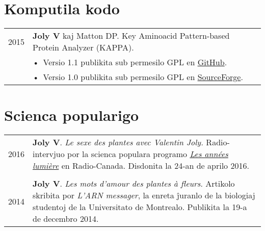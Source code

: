 \documentclass[letterpaper,12pt]{article}
\begin{document}
\vspace{6mm}

\section[Komputila kodo]{Komputila kodo}

\begin{tabularx}{\textwidth}{@{}r|X@{}}

2015
& \textbf{Joly V} kaj Matton DP. Key Aminoacid Pattern-based Protein Analyzer
  (KAPPA). \\
& \small \hspace{1.5mm} •~Versio 1.1 publikita sub permesilo GPL en
  \href{https://github.com/valentinjoly/kappa-1.1}{GitHub}. \\
& \small \hspace{1.5mm} •~Versio 1.0 publikita sub permesilo GPL en
  \href{https://sourceforge.net/projects/kappa-sequence-search/}{SourceForge}.
  \\

\end{tabularx}

\vspace{6mm}

\section[Scienca popularigo]{Scienca popularigo}

\begin{tabularx}{\textwidth}{@{}r|X@{}}

2016
& \textbf{Joly V}. {\em Le sexe des plantes avec Valentin Joly.} Radio-intervjuo
  por la scienca populara programo
  \href{http://ici.radio-canada.ca/emissions/les_annees_lumiere/2009-2010/chronique.asp?idChronique=404672}{\emph{Les années lumière}}
  en Radio-Canada. Disdonita la 24-an de aprilo 2016. \\

\multicolumn{2}{c}{} \\

2014
& \textbf{Joly V}. {\em Les mots d’amour des plantes à fleurs}. Artikolo
  skribita por \emph{L'ARN messager}, la enreta ĵuranlo de la biologiaj
  studentoj de la Universitato de Montrealo. Publikita la 19-a de decembro 2014.
  \\

\end{tabularx}

\newpage
\end{document}
